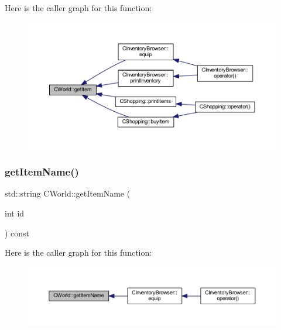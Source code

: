 Here is the caller graph for this function\+:\nopagebreak
\begin{figure}[H]
\begin{center}
\leavevmode
\includegraphics[width=350pt]{class_c_world_aae01822f61bfe35284a1ca9c02bdb1a5_icgraph}
\end{center}
\end{figure}
\mbox{\label{class_c_world_ac1e953c25242ba775f667aec3e6242bd}} 
\subsubsection{\texorpdfstring{get\+Item\+Name()}{getItemName()}}
{\footnotesize\ttfamily std\+::string C\+World\+::get\+Item\+Name (\begin{DoxyParamCaption}\item[{int}]{id }\end{DoxyParamCaption}) const\hspace{0.3cm}{\ttfamily [inline]}}

Here is the caller graph for this function\+:\nopagebreak
\begin{figure}[H]
\begin{center}
\leavevmode
\includegraphics[width=350pt]{class_c_world_ac1e953c25242ba775f667aec3e6242bd_icgraph}
\end{center}
\end{figure}
\mbox{\label{class_c_world_a72b79b6801a9e7ae670cc3790acf31d2}} 
